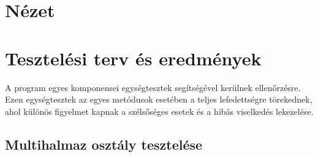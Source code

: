 \section{Nézet}



\section{Tesztelési terv és eredmények}

A program egyes komponensei egységtesztek segítségével kerülnek ellenőrzésre. Ezen egységtesztek az egyes metódusok esetében a teljes lefedettségre törekednek, ahol különös figyelmet kapnak a szélsőséges esetek és a hibás viselkedés lekezelése.

\subsection{Multihalmaz osztály tesztelése}

